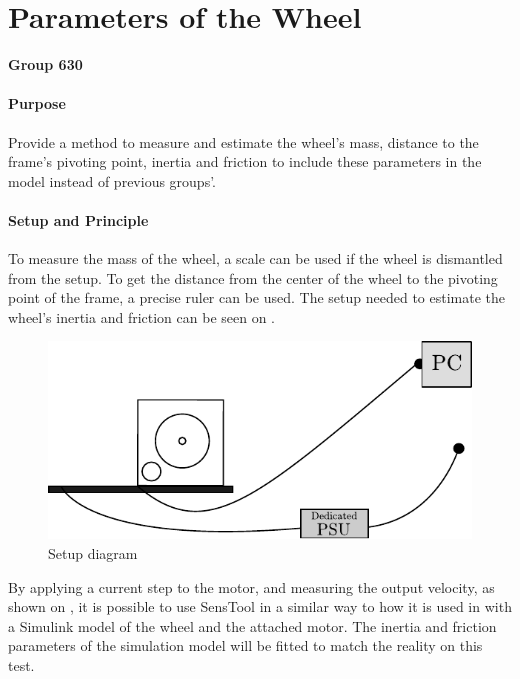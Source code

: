 \chapter{Parameters of the Wheel}\label{app:wheelParameters} 
\textbf{Group 630}\\

\subsubsection{Purpose}
Provide a method to measure and estimate the wheel's mass, distance to the frame's pivoting point, inertia and friction to include these parameters in the model instead of previous groups'.

\subsubsection{Setup and Principle}

To measure the mass of the wheel, a scale can be used if the wheel is dismantled from the setup. To get the distance from the center of the wheel to the pivoting point of the frame, a precise ruler can be used.
The setup needed to estimate the wheel's inertia and friction can be seen on .
\begin{figure}[H]
  \centering
  \includegraphics[scale=1]{figures/wheelParameterTestSetup}
  \caption{Setup diagram}
  \label{fig:wheelParameterTestSetup}
\end{figure}

By applying a current step to the motor, and measuring the output velocity, as shown on , it is possible to use SensTool in a similar way to how it is used in  with a Simulink model of the wheel and the attached motor. The inertia and friction parameters of the simulation model will be fitted to match the reality on this test.

